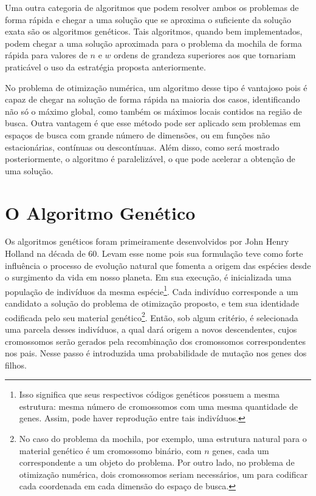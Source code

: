 Uma outra categoria de algoritmos que podem resolver ambos os problemas de forma rápida e chegar a uma
solução que se aproxima o suficiente da solução exata são os algoritmos genéticos. Tais algoritmos,
quando bem implementados, podem chegar a uma solução aproximada para o problema da mochila de forma
rápida para valores de $n$ e $w$ ordens de grandeza superiores aos que tornariam praticável o uso da
estratégia proposta anteriormente. 

No problema de otimização numérica, um algoritmo desse tipo é vantajoso pois é capaz de chegar na solução
de forma rápida na maioria dos casos, identificando não só o máximo global, como também os máximos
locais contidos na região de busca. Outra vantagem é que esse método pode ser aplicado sem problemas
em espaços de busca com grande número de dimensões, ou em funções não estacionárias, contínuas ou
descontínuas. Além disso, como será mostrado posteriormente, o algoritmo é paralelizável, o que pode
acelerar a obtenção de uma solução.

\section{O Algoritmo Genético}

Os algoritmos genéticos foram primeiramente desenvolvidos por John Henry
Holland \cite{holland1992ga} na década de 60. Levam esse nome pois sua formulação teve como 
forte influência o processo de evolução natural que fomenta a origem das espécies desde o surgimento da vida
em nosso planeta. Em sua execução, é inicializada uma população de indivíduos da mesma espécie\footnote{
  Isso significa que seus respectivos códigos genéticos possuem a mesma estrutura: mesma número de
  cromossomos com uma mesma quantidade de genes. Assim, pode haver reprodução entre tais indivíduos.
}.
Cada indivíduo corresponde a um candidato a solução do problema de otimização proposto, e tem sua
identidade codificada pelo seu material genético\footnote{
  No caso do problema da mochila, por exemplo, uma
  estrutura natural para o material genético é um cromossomo binário, com $n$ genes, cada um correspondente
  a um objeto do problema. Por outro lado, no problema de otimização numérica, dois cromossomos seriam
  necessários, um para codificar cada coordenada em cada dimensão do espaço de busca.
}.
Então, sob algum critério, é selecionada uma parcela desses indivíduos, a qual dará origem a novos
descendentes, cujos cromossomos serão gerados pela recombinação dos cromossomos correspondentes nos
pais. Nesse passo é introduzida uma probabilidade de mutação nos genes dos filhos. 

